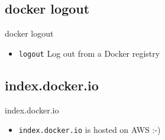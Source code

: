 \subsection{docker logout}\label{subsec:docker-logout}
\begin{frame}{docker logout}
    \begin{itemize}
        \item \texttt{logout} Log out from a Docker registry
        \pause
        
    \end{itemize}
\end{frame}

\subsection{index.docker.io}\label{subsec:index.docker.io}
\begin{frame}{index.docker.io}
    \begin{itemize}
        \item \texttt{index.docker.io} is hosted on AWS :-)
        \pause
        
    \end{itemize}
\end{frame}
